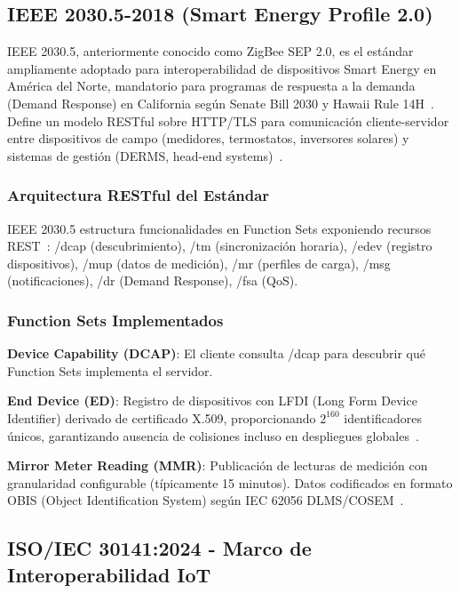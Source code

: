 \subsection{IEEE 2030.5-2018 (Smart Energy Profile 2.0)}
\label{sec:marco-ieee-2030-5}

IEEE 2030.5, anteriormente conocido como ZigBee SEP 2.0, es el estándar ampliamente adoptado para interoperabilidad de dispositivos Smart Energy en América del Norte, mandatorio para programas de respuesta a la demanda (Demand Response) en California según Senate Bill 2030 y Hawaii Rule 14H~\cite{IEEERecommendedPractice,CaliforniaCPUC2023}. Define un modelo RESTful sobre HTTP/TLS para comunicación cliente-servidor entre dispositivos de campo (medidores, termostatos, inversores solares) y sistemas de gestión (DERMS, head-end systems)~\cite{tangResearchInteroperabilityIoT}.

\subsubsection{Arquitectura RESTful del Estándar}

IEEE 2030.5 estructura funcionalidades en Function Sets exponiendo recursos REST~\cite{IEEERecommendedPractice}: /dcap (descubrimiento), /tm (sincronización horaria), /edev (registro dispositivos), /mup (datos de medición), /mr (perfiles de carga), /msg (notificaciones), /dr (Demand Response), /fsa (QoS).

\subsubsection{Function Sets Implementados}

\textbf{Device Capability (DCAP)}: El cliente consulta /dcap para descubrir qué Function Sets implementa el servidor.

\textbf{End Device (ED)}: Registro de dispositivos con LFDI (Long Form Device Identifier) derivado de certificado X.509, proporcionando $2^{160}$ identificadores únicos, garantizando ausencia de colisiones incluso en despliegues globales~\cite{IEEERecommendedPractice}.

\textbf{Mirror Meter Reading (MMR)}: Publicación de lecturas de medición con granularidad configurable (típicamente 15 minutos). Datos codificados en formato OBIS (Object Identification System) según IEC 62056 DLMS/COSEM~\cite{IEC62056-2021}.

\subsection{ISO/IEC 30141:2024 - Marco de Interoperabilidad IoT}
\label{sec:marco-iso-iec-30141}

